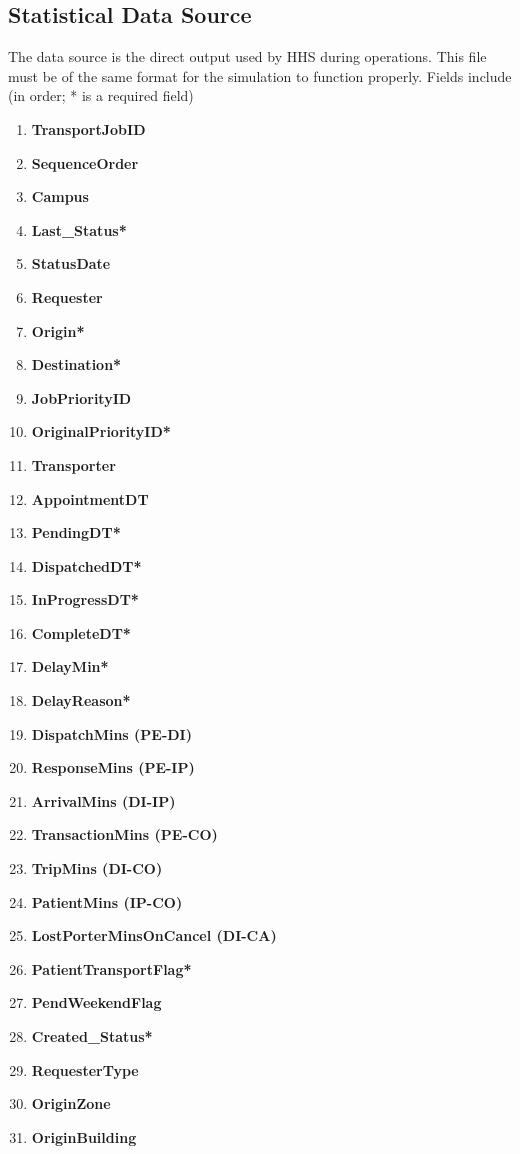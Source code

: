 \documentclass[paper=letter, fontsize=10pt]{scrartcl}
\numberwithin{equation}{section}		%
\numberwithin{figure}{section}			%
\numberwithin{table}{section}				%
\begin{document}
	\subsection{Statistical Data Source}
	The data source is the direct output used by HHS during operations. This file must be of the same format for the simulation to function properly. Fields include (in order; * is a required field)
	\begin{enumerate}
	\item \textbf{TransportJobID}
	\item \textbf{SequenceOrder}
	\item \textbf{Campus}
	\item \textbf{Last\_Status*}
	\item \textbf{StatusDate}
	\item \textbf{Requester}
	\item \textbf{Origin*}
	\item \textbf{Destination*}
	\item \textbf{JobPriorityID}
	\item \textbf{OriginalPriorityID*}
	\item \textbf{Transporter}
	\item \textbf{AppointmentDT}
	\item \textbf{PendingDT*}
	\item \textbf{DispatchedDT*}
	\item \textbf{InProgressDT*}
	\item \textbf{CompleteDT*}
	\item \textbf{DelayMin*}
	\item \textbf{DelayReason*}
	\item \textbf{DispatchMins (PE-DI)}
	\item \textbf{ResponseMins (PE-IP)}
	\item \textbf{ArrivalMins (DI-IP)}
	\item \textbf{TransactionMins (PE-CO)}
	\item \textbf{TripMins (DI-CO)}
	\item \textbf{PatientMins (IP-CO)}
	\item \textbf{LostPorterMinsOnCancel (DI-CA)}
	\item \textbf{PatientTransportFlag*}
	\item \textbf{PendWeekendFlag}
	\item \textbf{Created\_Status*}
	\item \textbf{RequesterType}
	\item \textbf{OriginZone}
	\item \textbf{OriginBuilding}

\end{enumerate}
\end{document}
